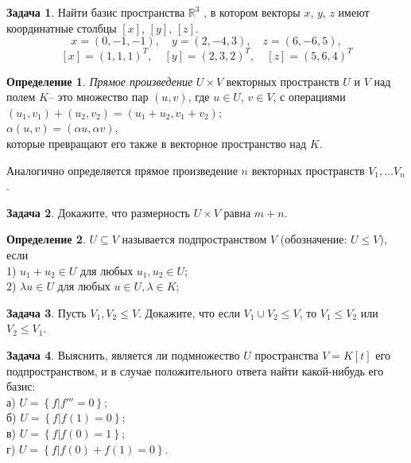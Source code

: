 \documentclass[12pt, fleqn]{extarticle}
\newcommand{\real}{\mathbb{R}}
\theoremstyle{definition}
\newtheorem{definition}{Определение}
\newtheorem{problem}{Задача}
\theoremstyle{remark}
\begin{document}
\begin{problem}
Найти базис пространства $\real^{3}$ , в котором векторы $x$, $y$, $z$
имеют координатные столбцы $[x]$, $[y]$, $[z]$.
$$x = (0, -1, -1), \quad y = (2, -4, 3), \quad z = (6, -6, 5),$$
$$[x] = (1, 1, 1)^{T}, \quad [y] = (2, 3, 2)^{T}, \quad [z] = (5, 6, 4)^{T}$$
\end{problem}

\begin{definition}
{\it Прямое произведение} $U \times V$ векторных пространств $U$ и $V$ над полем $K$-- это множество пар
$(u, v)$, где $u \in U$, $v \in V$, с операциями\\
$(u_1, v_1) + (u_2, v_2) = (u_1 + u_2, v_1 + v_2)$;\\
$\alpha (u, v) = (\alpha u, \alpha v)$,\\
которые превращают его также в векторное пространство над $K$.

Аналогично определяется прямое произведение $n$ векторных пространств $V_1, \ldots V_n$.
\end{definition}

\begin{problem}
Докажите, что размерность $U \times V$ равна $m + n$. 
\end{problem}

\begin{definition}
$U \subseteq V$ называется подпространством $V$ (обозначение: $U \leqslant V$), если\\
1) $u_{1} + u_{2} \in U$ для любых $u_{1}, u_{2} \in U$;\\
2) $\lambda u \in U$ для любых $u \in U, \lambda \in K$;
\end{definition}


\begin{problem}
Пусть $V_1,V_2\leq V$. 
Докажите, что если $V_1\cup V_2\leq V$, то $V_1\leq V_2$ или $V_2\leq V_1$.
\end{problem}


\begin{problem}
Выяснить, является ли подмножество $U$ пространства $V = K[t]$
его подпространством, и в случае положительного ответа найти
какой-нибудь его базис:\\
а) $U = \left\{f \vert f''' = 0 \right\}$;\\
б) $U = \left\{f \vert f(1) = 0 \right\}$;\\
в) $U = \left\{f \vert f(0) = 1 \right\}$;\\
г) $U = \left\{f \vert f(0) + f(1) = 0 \right\}$.
\end{problem}
\end{document}
